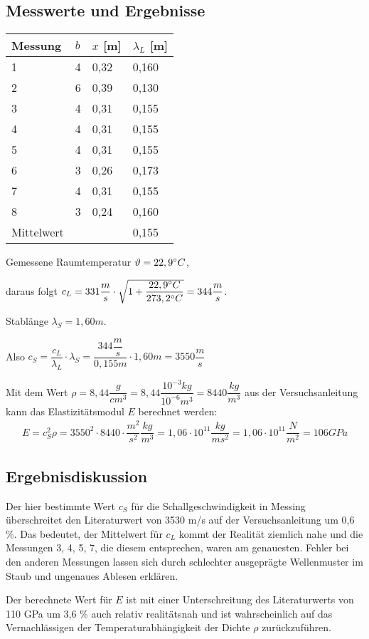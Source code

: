 \documentclass{scrartcl}
\begin{document}
\subsection{Messwerte und Ergebnisse}
\begin{table}[h]
\begin{tabular}{l|l|l|l}
Messung & $b$ & $x$ [m] & $\lambda_{L}$ [m]      \\
\hline
1       & 4            & 0,32    & 0,160 \\
2       & 6            & 0,39    & 0,130 \\
3       & 4            & 0,31    & 0,155 \\
4       & 4            & 0,31    & 0,155 \\
5       & 4            & 0,31    & 0,155 \\
6       & 3            & 0,26    & 0,173 \\
7       & 4            & 0,31    & 0,155 \\
8       & 3            & 0,24    & 0,160 \\
\hline
Mittelwert & & & 0,155
\end{tabular}
\end{table}
Gemessene Raumtemperatur $\vartheta = 22,9\degree C$,

daraus folgt $c_{L} = 331 \dfrac{m}{s} \cdot \sqrt{1+\dfrac{22,9\degree C}{273,2 \degree C}} = 344 \dfrac{m}{s}$.

Stablänge $\lambda_{S} = 1,60m$.

Also $c_{S} = \dfrac{c_{L}}{\lambda_{L}} \cdot \lambda_{S} = \dfrac{344\dfrac{m}{s}}{0,155m} \cdot 1,60m = 3550 \dfrac{m}{s}$

Mit dem Wert $\rho = 8,44 \dfrac{g}{cm^3} = 8,44 \dfrac{10^{-3} kg}{10^{-6} m^3} = 8440 \dfrac{kg}{m^3}$ aus der Versuchsanleitung \\ kann das Elastizitätsmodul $E$ berechnet werden:
\begin{align*}
E = c_{S}^2 \rho = 3550^2 \cdot 8440 \cdot \dfrac{m^2}{s^2} \dfrac{kg}{m^3} = 1,06 \cdot 10^{11} \dfrac{kg}{ms^2} = 1,06 \cdot 10^{11} \dfrac{N}{m^2} = 106 GPa
\end{align*}

\subsection{Ergebnisdiskussion}
Der hier bestimmte Wert $c_{S}$ für die Schallgeschwindigkeit in Messing überschreitet den Literaturwert  von 3530 m/s auf der Versuchsanleitung um 0,6 \%. Das bedeutet, der Mittelwert für $c_{L}$ kommt der Realität ziemlich nahe und die Messungen 3, 4, 5, 7, die diesem entsprechen, waren am genauesten. Fehler bei den anderen Messungen lassen sich durch schlechter ausgeprägte Wellenmuster im Staub und ungenaues Ablesen erklären. 

Der berechnete Wert für $E$ ist mit einer Unterschreitung des Literaturwerts von 110 GPa um 3,6 \% auch relativ realitätsnah und ist wahrscheinlich auf das Vernachlässigen der Temperaturabhängigkeit der Dichte $\rho$ zurückzuführen.
\end{document}
